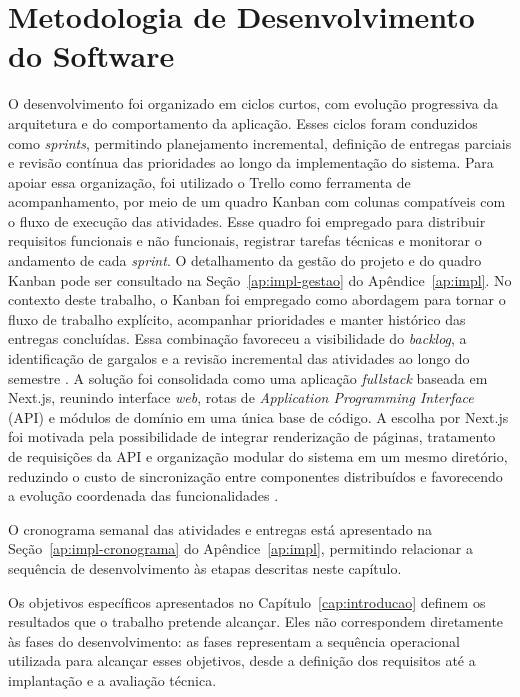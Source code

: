 \section{Metodologia de Desenvolvimento do Software}

O desenvolvimento foi organizado em ciclos curtos, com evolução progressiva da arquitetura e
do comportamento da aplicação. Esses ciclos foram conduzidos como \textit{sprints}, permitindo
planejamento incremental, definição de entregas parciais e revisão contínua das prioridades
ao longo da implementação do sistema. Para apoiar essa organização, foi utilizado o Trello
como ferramenta de acompanhamento, por meio de um quadro Kanban com colunas compatíveis com
o fluxo de execução das atividades. Esse quadro foi empregado para distribuir requisitos
funcionais e não funcionais, registrar tarefas técnicas e monitorar o andamento de cada \textit{sprint}. 
O detalhamento da gestão do projeto e do quadro Kanban pode ser consultado na Seção~\ref{ap:impl-gestao} 
do Apêndice~\ref{ap:impl}. No contexto deste trabalho, o Kanban foi empregado como abordagem para 
tornar o fluxo de trabalho explícito, acompanhar prioridades e manter histórico das entregas concluídas. 
Essa combinação favoreceu a visibilidade do \textit{backlog}, a identificação de gargalos e a revisão incremental
das atividades ao longo do semestre \cite{atlassiankanban2026}. A solução foi consolidada como uma
aplicação \textit{fullstack} baseada em Next.js, reunindo interface \textit{web}, rotas de \textit{Application Programming Interface} (API) e módulos
de domínio em uma única base de código. A escolha por Next.js foi motivada pela possibilidade
de integrar renderização de páginas, tratamento de requisições da API e organização modular do
sistema em um mesmo diretório, reduzindo o custo de sincronização entre componentes distribuídos
e favorecendo a evolução coordenada das funcionalidades \cite{jovanovic2024,nextjsroutehandlers2026}.

O cronograma semanal das atividades e entregas está apresentado na Seção~\ref{ap:impl-cronograma}
do Apêndice~\ref{ap:impl}, permitindo relacionar a sequência de desenvolvimento às etapas descritas
neste capítulo.

Os objetivos específicos apresentados no Capítulo~\ref{cap:introducao} definem os resultados que o
trabalho pretende alcançar. Eles não correspondem diretamente às fases do desenvolvimento: as fases
representam a sequência operacional utilizada para alcançar esses objetivos, desde a definição dos
requisitos até a implantação e a avaliação técnica.

